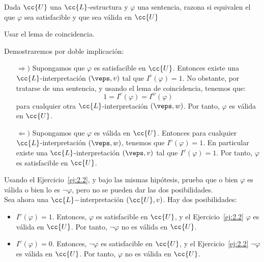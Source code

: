 \begin{ejercicio}\label{ej:2.2}
    Dada $\cc{U}$ una $\cc{L}$-estructura y $\varphi$ una sentencia, razona si equivalen el que $\varphi$ sea satisfacible y que sea válida en $\cc{U}$
    \begin{observacion}
        Usar el lema de coincidencia.
    \end{observacion}

    Demostraremos por doble implicación:
    \begin{itemize}
        \item[$\Longrightarrow)$] Supongamos que $\varphi$ es satisfacible en $\cc{U}$. Entonces existe una $\cc{L}$-interpretación $(\veps,v)$ tal que $I^v(\varphi) = 1$. No obstante, por tratarse de una sentencia, y usando el lema de coincidencia, tenemos que:
        \begin{equation*}
            1 = I^v(\varphi) = I^{w}(\varphi)
        \end{equation*}
        para cualquier otra $\cc{L}$-interpretación $(\veps,w)$. Por tanto, $\varphi$ es válida en $\cc{U}$.

        \item[$\Longleftarrow)$] Supongamos que $\varphi$ es válida en $\cc{U}$. Entonces para cualquier $\cc{L}$-interpretación $(\veps,w)$, tenemos que $I^v(\varphi) = 1$. En particular existe una $\cc{L}$-interpretación $(\veps,v)$ tal que $I^v(\varphi) = 1$. Por tanto, $\varphi$ es satisfacible en $\cc{U}$.
    \end{itemize}
\end{ejercicio}

\begin{ejercicio}\label{ej:2.3}
    Usando el Ejercicio~\ref{ej:2.2}, y bajo las mismas hipótesis, prueba que o bien $\varphi$ es válida o bien lo es $\neg \varphi$, pero no se pueden dar las dos posibilidades.\\

    Sea ahora una $\cc{L}-$interpretación $(\cc{U},v)$. Hay dos posibilidades:
    \begin{itemize}
        \item \ul{$I^v(\varphi) = 1$}. Entonces, $\varphi$ es satisfacible en $\cc{U}$, y el Ejercicio~\ref{ej:2.2} $\varphi$ es válida en $\cc{U}$. Por tanto, $\neg \varphi$ no es válida en $\cc{U}$.
        
        \item \ul{$I^v(\varphi) = 0$}. Entonces, $\neg \varphi$ es satisfacible en $\cc{U}$, y el Ejercicio~\ref{ej:2.2} $\neg \varphi$ es válida en $\cc{U}$. Por tanto, $\varphi$ no es válida en $\cc{U}$.
    \end{itemize}
\end{ejercicio}

